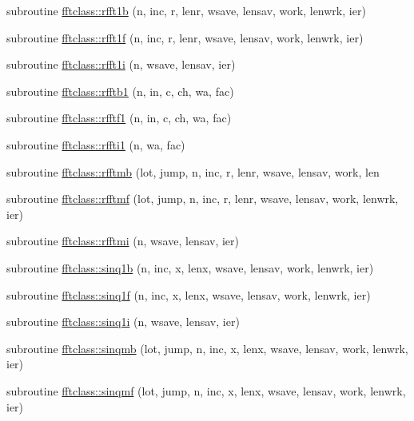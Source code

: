\begin{DoxyCompactItemize}
subroutine \mbox{\hyperlink{namespacefftclass_a2bdd31e65a4abb79ed9e0eeaa71cee6b}{fftclass\+::rfft1b}} (n, inc, r, lenr, wsave, lensav, work, lenwrk, ier)
\item 
subroutine \mbox{\hyperlink{namespacefftclass_ad5aa2059236e01ea65aecda114c3f45f}{fftclass\+::rfft1f}} (n, inc, r, lenr, wsave, lensav, work, lenwrk, ier)
\item 
subroutine \mbox{\hyperlink{namespacefftclass_abb3d8b6f0166090db98de3e7d627434f}{fftclass\+::rfft1i}} (n, wsave, lensav, ier)
\item 
subroutine \mbox{\hyperlink{namespacefftclass_a338a7a4db13f2357c42a682142df3190}{fftclass\+::rfftb1}} (n, in, c, ch, wa, fac)
\item 
subroutine \mbox{\hyperlink{namespacefftclass_af9f24f143ca02395c91f7757343e8003}{fftclass\+::rfftf1}} (n, in, c, ch, wa, fac)
\item 
subroutine \mbox{\hyperlink{namespacefftclass_a122822a405cd96e5df936acaad731746}{fftclass\+::rffti1}} (n, wa, fac)
\item 
subroutine \mbox{\hyperlink{namespacefftclass_acc4295c5a3646519e26c3dd5ae66418d}{fftclass\+::rfftmb}} (lot, jump, n, inc, r, lenr, wsave, lensav, work, len
\item 
subroutine \mbox{\hyperlink{namespacefftclass_a4662111bc784aa321b0567a1a0578963}{fftclass\+::rfftmf}} (lot, jump, n, inc, r, lenr, wsave, lensav, work, lenwrk, ier)
\item 
subroutine \mbox{\hyperlink{namespacefftclass_a6a543283f910322f94293d719f923881}{fftclass\+::rfftmi}} (n, wsave, lensav, ier)
\item 
subroutine \mbox{\hyperlink{namespacefftclass_a6770a2a0c7bdf09af5ed719175fb4ca4}{fftclass\+::sinq1b}} (n, inc, x, lenx, wsave, lensav, work, lenwrk, ier)
\item 
subroutine \mbox{\hyperlink{namespacefftclass_a205d9dc43dfb082cdee420a4ae2fb269}{fftclass\+::sinq1f}} (n, inc, x, lenx, wsave, lensav, work, lenwrk, ier)
\item 
subroutine \mbox{\hyperlink{namespacefftclass_aa0d2ffdfc38a79ecd1b47de75f3d1084}{fftclass\+::sinq1i}} (n, wsave, lensav, ier)
\item 
subroutine \mbox{\hyperlink{namespacefftclass_aa7e7e40b824e045f452a09a2e7abf333}{fftclass\+::sinqmb}} (lot, jump, n, inc, x, lenx, wsave, lensav, work, lenwrk, ier)
\item 
subroutine \mbox{\hyperlink{namespacefftclass_ae56c7f24f27f2fb48f15359441b5e82f}{fftclass\+::sinqmf}} (lot, jump, n, inc, x, lenx, wsave, lensav, work, lenwrk, ier)

\end{DoxyCompactItemize}
